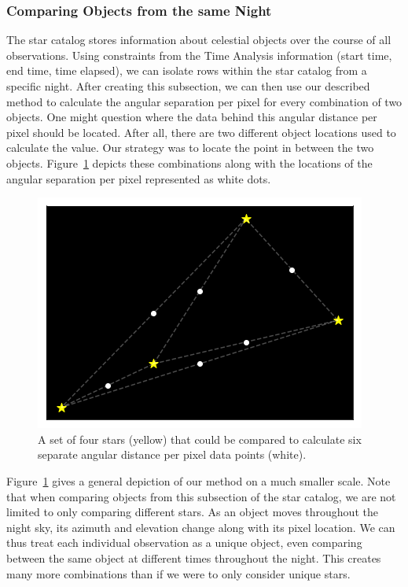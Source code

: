 \subsubsection{Comparing Objects from the same Night}

The star catalog stores information about celestial objects over the course of all observations.
Using constraints from the Time Analysis information (start time, end time, time elapsed), we can isolate rows within the star catalog from a specific night.  
After creating this subsection, we can then use our described method to calculate the angular separation per pixel for every combination of two objects.
One might question where the data behind this angular distance per pixel should be located.
After all, there are two different object locations used to calculate the value.
Our strategy was to locate the point in between the two objects.  
Figure~\ref{starcombos} depicts these combinations along with the locations of the angular separation per pixel represented as white dots.

\begin{figure}[ht!]
  \centering
  \includegraphics[scale=0.70]{images/star_combinations.png}
  \caption{A set of four stars (yellow) that could be compared to calculate six separate angular distance per pixel data points (white).}
  \label{starcombos}
\end{figure}

Figure~\ref{starcombos} gives a general depiction of our method on a much smaller scale.
Note that when comparing objects from this subsection of the star catalog, we are not limited to only comparing different stars.
As an object moves throughout the night sky, its azimuth and elevation change along with its pixel location.
We can thus treat each individual observation as a unique object, even comparing between the same object at different times throughout the night.
This creates many more combinations than if we were to only consider unique stars.

